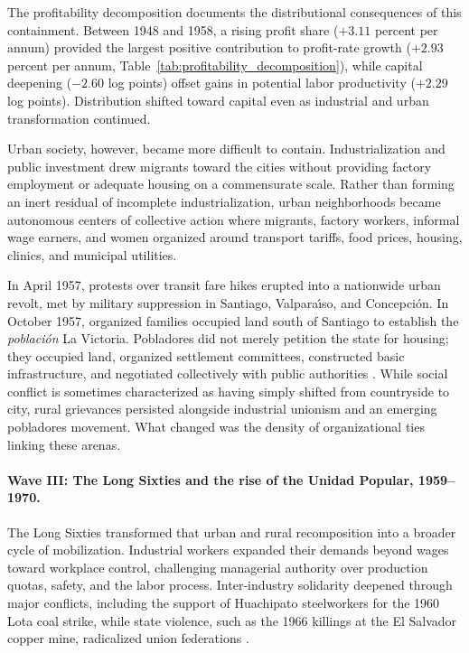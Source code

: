 The profitability decomposition documents the distributional consequences of this containment. Between 1948 and 1958, a rising profit share ($+3.11$ percent per annum) provided the largest positive contribution to profit-rate growth ($+2.93$ percent per annum, Table~\ref{tab:profitability_decomposition}), while capital deepening ($-2.60$ log points) offset gains in potential labor productivity ($+2.29$ log points). Distribution shifted toward capital even as industrial and urban transformation continued.

Urban society, however, became more difficult to contain. Industrialization and public investment drew migrants toward the cities without providing factory employment or adequate housing on a commensurate scale. Rather than forming an inert residual of incomplete industrialization, urban neighborhoods became autonomous centers of collective action where migrants, factory workers, informal wage earners, and women organized around transport tariffs, food prices, housing, clinics, and municipal utilities.

In April 1957, protests over transit fare hikes erupted into a nationwide urban revolt, met by military suppression in Santiago, Valpara\'{\i}so, and Concepci\'on. In October 1957, organized families occupied land south of Santiago to establish the \emph{poblaci\'on} La Victoria. Pobladores did not merely petition the state for housing; they occupied land, organized settlement committees, constructed basic infrastructure, and negotiated collectively with public authorities \citep{Garces2002,Murphy2015}. While social conflict is sometimes characterized as having simply shifted from countryside to city, rural grievances persisted alongside industrial unionism and an emerging pobladores movement. What changed was the density of organizational ties linking these arenas.

\paragraph{Wave III: The Long Sixties and the rise of the Unidad Popular, 1959--1970.}
The Long Sixties transformed that urban and rural recomposition into a broader cycle of mobilization. Industrial workers expanded their demands beyond wages toward workplace control, challenging managerial authority over production quotas, safety, and the labor process. Inter-industry solidarity deepened through major conflicts, including the support of Huachipato steelworkers for the 1960 Lota coal strike, while state violence, such as the 1966 killings at the El Salvador copper mine, radicalized union federations \citep{Thielemann2018}.

